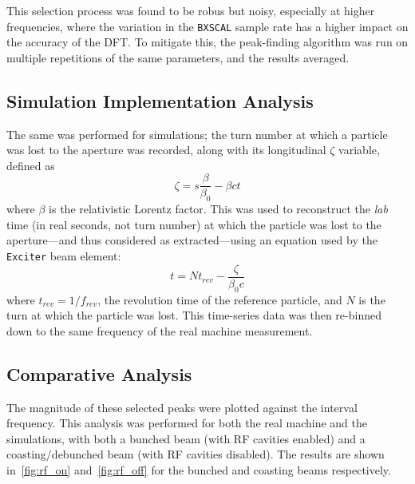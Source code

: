 \documentclass[11pt]{report}
\begin{document}
This selection process was found to be robus but noisy, especially at higher frequencies, where the variation in the \verb|BXSCAL| sample rate has a higher impact on the accuracy of the DFT. To mitigate this, the peak-finding algorithm was run on multiple repetitions of the same parameters, and the results averaged.



\subsection{Simulation Implementation Analysis}

The same was performed for simulations; the turn number at which a particle was lost to the aperture was recorded, along with its longitudinal $\zeta$ variable, defined as
\begin{equation}
  \zeta = s \frac{\beta}{\beta_0} - \beta c t
\end{equation}
where $\beta$ is the relativistic Lorentz factor. This was used to reconstruct the \textit{lab} time (in real seconds, not turn number) at which the particle was lost to the aperture---and thus considered as extracted---using an equation used by the \verb|Exciter| beam element:
\begin{equation}
  t = N t_{rev} - \frac\zeta{\beta_0 c}
\end{equation}
where $t_{rev}=1/f_{rev}$, the revolution time of the reference particle, and $N$ is the turn at which the particle was lost. This time-series data was then re-binned down to the same frequency of the real machine measurement.


\subsection{Comparative Analysis}
The magnitude of these selected peaks were plotted against the interval frequency. This analysis was performed for both the real machine and the simulations, with both a bunched beam (with RF cavities enabled) and a coasting/debunched beam (with RF cavities disabled). The results are shown in~\autoref{fig:rf_on} and~\autoref{fig:rf_off} for the bunched and coasting beams respectively.
\end{document}

